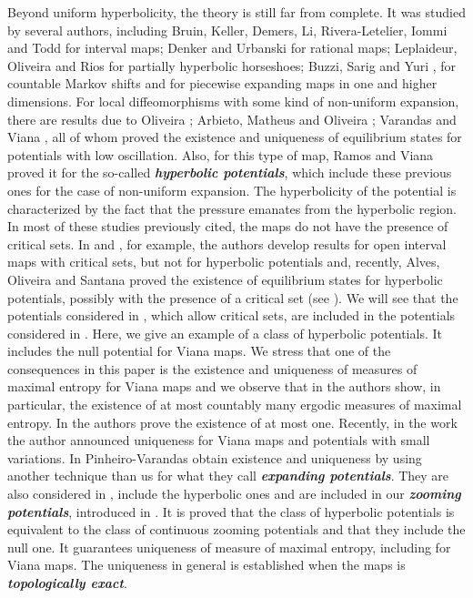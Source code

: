 \documentclass[12pt,a4paper]{amsart}
\theoremstyle{plain}
\begin{document}
Beyond uniform hyperbolicity, the theory is still far from complete. It was studied by several authors, including Bruin, Keller, Demers, Li, Rivera-Letelier, Iommi and Todd 
\cite{BDM, BK, BT,DT,IT1,IT2,LRL} for interval maps; Denker and Urbanski  \cite{DU} for rational maps; Leplaideur, Oliveira and Rios 
\cite{LOR} for partially hyperbolic horseshoes; Buzzi, Sarig and Yuri \cite{BS,Y}, for countable Markov shifts and for piecewise expanding maps in one and higher dimensions. 
For local diffeomorphisms with some kind of non-uniform expansion, there are results due to Oliveira \cite{O}; Arbieto, Matheus and Oliveira \cite{AMO};
Varandas and Viana \cite{VV}, all of whom proved the existence and uniqueness of equilibrium states for potentials with low oscillation. Also, for this type of map,
Ramos and Viana  \cite{RV}  proved it for the so-called  \textbf{\textit{hyperbolic potentials}}, which include these previous ones for the case of non-uniform expansion. The hyperbolicity of the potential is
characterized by the fact that the pressure emanates from the hyperbolic region. In most of these studies previously cited, the maps do not have the presence of critical sets. In \cite{BDM} and \cite{DT}, for example, the authors develop results for open interval maps with critical sets, but not for hyperbolic potentials and, recently, Alves, Oliveira and Santana proved the existence of equilibrium states for hyperbolic potentials, possibly with the presence of a critical set (see \cite{AOS}). We will see that the potentials considered in \cite{LRL}, which allow critical sets, are included in the potentials considered in \cite{AOS}. Here, we give an example of a class of hyperbolic potentials. It includes the null potential for Viana maps. We stress that one of the consequences in this paper is the existence and uniqueness of measures of maximal entropy for Viana maps and we observe that in \cite{ALP} the authors show, in particular, the existence of at most countably many ergodic measures of maximal entropy. In \cite{LOP} the authors prove the existence of at most one. Recently, in the work \cite{L} the author announced uniqueness for Viana maps and potentials with small variations. In \cite{PV} Pinheiro-Varandas obtain existence and uniqueness by using another technique than us for what they call \textbf{\textit{expanding potentials}}. They are also considered in \cite{AOS}, include the hyperbolic ones and are included in our \textbf{\textit{zooming potentials}}, introduced in \cite{S}. It is proved that the class of hyperbolic potentials is equivalent to the class of continuous zooming potentials and that they include the null one. It guarantees uniqueness of measure of maximal entropy, including for Viana maps. The uniqueness in general is established when the maps is \textbf{\textit{topologically exact}}.
\end{document}
